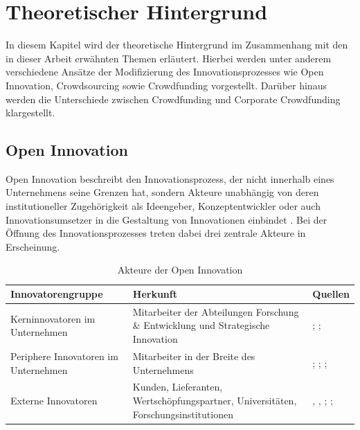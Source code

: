 \chapter{Theoretischer Hintergrund}
In diesem Kapitel wird der theoretische Hintergrund im Zusammenhang mit den in dieser Arbeit erwähnten Themen erläutert. Hierbei werden unter anderem verschiedene Ansätze der Modifizierung des Innovationsprozesses wie Open Innovation, Crowdsourcing sowie Crowdfunding vorgestellt. Darüber hinaus werden die Unterschiede zwischen Crowdfunding und Corporate Crowdfunding klargestellt.
\section{Open Innovation}
Open Innovation beschreibt den Innovationsprozess, der nicht innerhalb eines Unternehmens seine Grenzen hat, sondern Akteure unabhängig von deren institutioneller Zugehörigkeit als Ideengeber, Konzeptentwickler oder auch Innovationsumsetzer in die Gestaltung von Innovationen einbindet \cite[85]{Zerfaß2009}. Bei der Öffnung des Innovationsprozesses treten dabei drei zentrale Akteure in Erscheinung.

\begin{table}[htb]
\centering
\begin{tabular}{p{4cm} | p{5cm} | p{4.8cm}}
\hline
\textbf{Innovatorengruppe} & \textbf{Herkunft} & \textbf{Quellen} \\
\hline
Kerninnovatoren im Unternehmen & Mitarbeiter der Abteilungen Forschung \& Entwicklung und Strategische Innovation & \citeauthor{schumpeter1934} \citeyear{schumpeter1934}; \newline
	\citeauthor{wheelwright1992} \citeyear{wheelwright1992};  \newline
	\citeauthor{vissers_dankbaar2002} \citeyear{vissers_dankbaar2002} \\ 
\hline
Periphere Innovatoren im Unternehmen & Mitarbeiter in der Breite des Unternehmens & \citeauthor{Robinson:1486035} \citeyear{Robinson:1486035}; \newline
	\citeauthor{berger2005} \citeyear{berger2005}; \newline
	\citeauthor{Huff2006} \citeyear{Huff2006}; \\
\hline
Externe Innovatoren & Kunden, Lieferanten, Wertschöpfungspartner, Universitäten, Forschungsinstitutionen & \citeauthor{Hippel1978} \citeyear{Hippel1978}, \citeyear{Hippel1986}, \citeyear{Hippel2006}; \citeauthor{reichwald2006open} \citeyear{reichwald2006open}; \\
\hline
\end{tabular}
\caption{Akteure der Open Innovation \cites[91]{Zerfaß2009}[8]{moslein2010open} }
\end{table}

